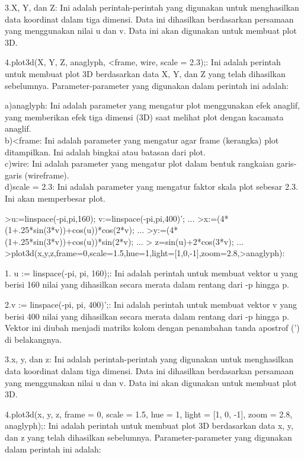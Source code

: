 \documentclass[a4paper,10pt]{article}
\begin{document}
\begin{eulernotebook}
\begin{eulercomment}
\begin{eulercomment}
\begin{eulercomment}
\begin{eulercomment}
\begin{eulercomment}
\begin{eulercomment}
\begin{eulercomment}
\begin{eulercomment}
\begin{eulercomment}
3.X, Y, dan Z: Ini adalah perintah-perintah yang digunakan untuk
menghasilkan data koordinat dalam tiga dimensi. Data ini dihasilkan
berdasarkan persamaan yang menggunakan nilai u dan v. Data ini akan
digunakan untuk membuat plot 3D.

4.plot3d(X, Y, Z, anaglyph, \textless{}frame, wire, scale = 2.3);: Ini adalah
perintah untuk membuat plot 3D berdasarkan data X, Y, dan Z yang telah
dihasilkan sebelumnya. Parameter-parameter yang digunakan dalam
perintah ini adalah:

a)anaglyph: Ini adalah parameter yang mengatur plot menggunakan efek
anaglif, yang memberikan efek tiga dimensi (3D) saat melihat plot
dengan kacamata anaglif.\\
b)\textless{}frame: Ini adalah parameter yang mengatur agar frame (kerangka)
plot ditampilkan. Ini adalah bingkai atau batasan dari plot.\\
c)wire: Ini adalah parameter yang mengatur plot dalam bentuk rangkaian
garis-garis (wireframe).\\
d)scale = 2.3: Ini adalah parameter yang mengatur faktor skala plot
sebesar 2.3. Ini akan memperbesar plot.
\end{eulercomment}
\begin{eulerprompt}
>u:=linspace(-pi,pi,160); v:=linspace(-pi,pi,400)';  ...
>x:=(4*(1+.25*sin(3*v))+cos(u))*cos(2*v); ...
>y:=(4*(1+.25*sin(3*v))+cos(u))*sin(2*v); ...
> z=sin(u)+2*cos(3*v); ...
>plot3d(x,y,z,frame=0,scale=1.5,hue=1,light=[1,0,-1],zoom=2.8,>anaglyph):
\end{eulerprompt}
\begin{eulercomment}
1. u := linspace(-pi, pi, 160);: Ini adalah perintah untuk membuat
vektor u yang berisi 160 nilai yang dihasilkan secara merata dalam
rentang dari -p hingga p.

2.v := linspace(-pi, pi, 400)';: Ini adalah perintah untuk membuat
vektor v yang berisi 400 nilai yang dihasilkan secara merata dalam
rentang dari -p hingga p. Vektor ini diubah menjadi matriks kolom
dengan penambahan tanda apostrof (') di belakangnya.

3.x, y, dan z: Ini adalah perintah-perintah yang digunakan untuk
menghasilkan data koordinat dalam tiga dimensi. Data ini dihasilkan
berdasarkan persamaan yang menggunakan nilai u dan v. Data ini akan
digunakan untuk membuat plot 3D.

4.plot3d(x, y, z, frame = 0, scale = 1.5, hue = 1, light = [1, 0, -1],
zoom = 2.8, anaglyph);: Ini adalah perintah untuk membuat plot 3D
berdasarkan data x, y, dan z yang telah dihasilkan sebelumnya.
Parameter-parameter yang digunakan dalam perintah ini adalah:


\end{eulercomment}
\end{eulercomment}
\end{eulercomment}
\end{eulercomment}
\end{eulercomment}
\end{eulercomment}
\end{eulercomment}
\end{eulercomment}
\end{eulercomment}
\end{eulernotebook}
\end{document}
